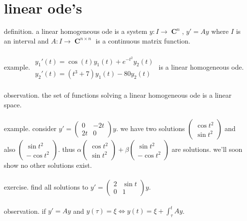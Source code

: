 \documentclass{article}
\DeclareMathOperator{\C}{\mathbf{C}}
\begin{document}

\newpage
\section*{linear ode's}
definition. a linear homogeneous ode is a system $y:I\to \C^n$, $y'=Ay$ where $I$ is an interval and $A:I\to \C^{n\times n}$ is a continuous matrix function. \\\\
example. $\begin{array}{c}
y_{1}'(t)=\cos(t)y_{1}(t)+e^{-t^{2}}y_{2}(t)\\
y_{2}'(t)=(t^{3}+7)y_{1}(t)-80y_{2}(t)
\end{array}$ is a linear homogeneous ode. \\\\
observation. the set of functions solving a linear homogeneous ode is a linear space. \\\\
example. consider $y'=\left(\begin{array}{cc}
0 & -2t\\
2t & 0
\end{array}\right)y$. we have two solutions $\left(\begin{array}{c}
\cos t^{2}\\
\sin t^{2}
\end{array}\right)$ and also $\left(\begin{array}{c}
\sin t^{2}\\
-\cos t^{2}
\end{array}\right)$. thus $\alpha \left(\begin{array}{c}
\cos t^{2}\\
\sin t^{2}
\end{array}\right)+\beta\left(\begin{array}{c}
\sin t^{2}\\
-\cos t^{2}
\end{array}\right)$ are solutions. we'll soon show no other solutions exist.\\\\
exercise. find all solutions to $y'=\left(\begin{array}{cc}
2 & \sin t\\
0 & 1
\end{array}\right)y$. \\\\
observation. if $y'=Ay$ and $y(\tau)=\xi\iff y(t)=\xi+\int_\tau^t Ay$. \\\\
\end{document}

